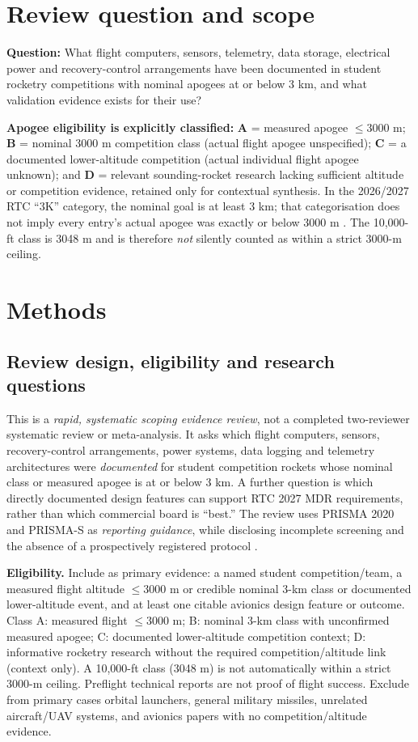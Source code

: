 \documentclass[10pt,a4paper]{article}
\begin{document}
\section{Review question and scope}
\textbf{Question:} What flight computers, sensors, telemetry, data storage, electrical power and recovery-control arrangements have been documented in student rocketry competitions with nominal apogees at or below 3 km, and what validation evidence exists for their use?

\textbf{Apogee eligibility is explicitly classified:} \textbf{A} = measured apogee $\leq3000$ m; \textbf{B} = nominal 3000 m competition class (actual flight apogee unspecified); \textbf{C} = a documented lower-altitude competition (actual individual flight apogee unknown); and \textbf{D} = relevant sounding-rocket research lacking sufficient altitude or competition evidence, retained only for contextual synthesis. In the 2026/2027 RTC ``3K'' category, the nominal goal is at least 3 km; that categorisation does not imply every entry's actual apogee was exactly or below 3000 m \cite{rtc2027rules}. The 10,000-ft class is 3048 m and is therefore \emph{not} silently counted as within a strict 3000-m ceiling.


\section{Methods}
\subsection{Review design, eligibility and research questions}
This is a \emph{rapid, systematic scoping evidence review}, not a completed two-reviewer systematic review or meta-analysis. It asks which flight computers, sensors, recovery-control arrangements, power systems, data logging and telemetry architectures were \emph{documented} for student competition rockets whose nominal class or measured apogee is at or below 3 km. A further question is which directly documented design features can support RTC 2027 MDR requirements, rather than which commercial board is ``best.'' The review uses PRISMA 2020 and PRISMA-S as \emph{reporting guidance}, while disclosing incomplete screening and the absence of a prospectively registered protocol \cite{page2021,rethlefsen2021}.

\textbf{Eligibility.} Include as primary evidence: a named student competition/team, a measured flight altitude $\leq3000$ m or credible nominal 3-km class or documented lower-altitude event, and at least one citable avionics design feature or outcome. Class A: measured flight $\leq3000$ m; B: nominal 3-km class with unconfirmed measured apogee; C: documented lower-altitude competition context; D: informative rocketry research without the required competition/altitude link (context only). A 10,000-ft class (3048 m) is not automatically within a strict 3000-m ceiling. Preflight technical reports are not proof of flight success. Exclude from primary cases orbital launchers, general military missiles, unrelated aircraft/UAV systems, and avionics papers with no competition/altitude evidence.
\end{document}
